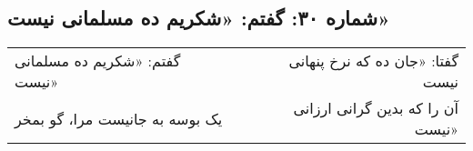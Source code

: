 \begin{center}
\section*{شماره ۳۰: گفتم: «شکریم ده مسلمانی نیست»}
\label{sec:030}
\begin{longtable}{l p{0.5cm} r}
گفتم: «شکریم ده مسلمانی نیست»
&&
گفتا: «جان ده که نرخ پنهانی نیست
\\
یک بوسه به جانیست مرا، گو بمخر
&&
آن را که بدین گرانی ارزانی نیست»
\\
\end{longtable}
\end{center}
